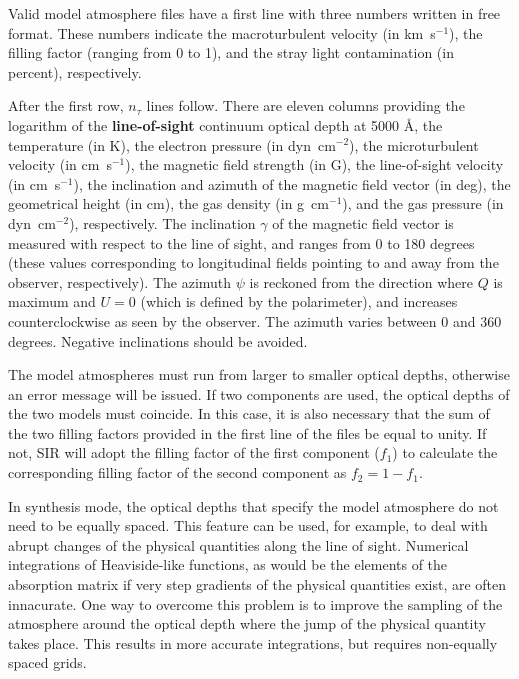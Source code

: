 \documentclass[11pt]{report}
\begin{document}
Valid model atmosphere files have a first line with three numbers
written in free format. These numbers indicate the macroturbulent
velocity (in km~s$^{-1}$), the filling factor (ranging from 0 to 1),
and the stray light contamination (in percent), respectively.

After the first row, $n_\tau$ lines follow. There are eleven columns 
providing the logarithm of the {\bf line-of-sight} continuum 
optical depth at 5000 \AA\/, the temperature (in K), the 
electron pressure (in dyn~cm$^{-2}$), the microturbulent velocity (in
cm~s$^{-1}$), the magnetic field strength (in G), the line-of-sight
velocity (in cm~s$^{-1}$), the inclination and azimuth of the
magnetic field vector (in deg), the geometrical height (in cm), the 
gas density (in g~cm$^{-1}$), and the gas pressure (in dyn~cm$^{-2}$), 
respectively. The inclination $\gamma$ of the magnetic field vector is 
measured with respect to the line of sight, and ranges from 0 to 180 
degrees (these values corresponding to longitudinal fields pointing to
and away from the observer, respectively). The azimuth 
$\psi$ is reckoned from the direction where $Q$ is maximum and $U=0$ 
(which is defined by the polarimeter), and increases counterclockwise 
as seen by the observer. The azimuth varies between 0 and 360 degrees.  
Negative inclinations should be avoided. 

The model atmospheres must run from larger to smaller optical depths,
otherwise an error message will be issued. If two components are 
used, the optical depths of the two models must coincide. In this
case, it is also necessary that the sum of the two filling factors
provided in the first line of the files be equal to unity. If not, SIR
will adopt the filling factor of the first component ($f_1$) to 
calculate the corresponding filling factor of the second component
as $f_2 = 1 - f_1$.

In synthesis mode, the optical depths that specify the model atmosphere
do not need to be equally spaced. This feature can be used, for
example, to deal with abrupt changes of the physical quantities along
the line of sight. Numerical integrations of Heaviside-like functions, 
as would be the elements of the absorption matrix if very step
gradients of the physical quantities exist, are often innacurate. One
way to overcome this problem is to improve the sampling of the
atmosphere around the optical depth where the jump of the physical
quantity takes place. This results in more accurate integrations, but
requires non-equally spaced grids.
\end{document}
